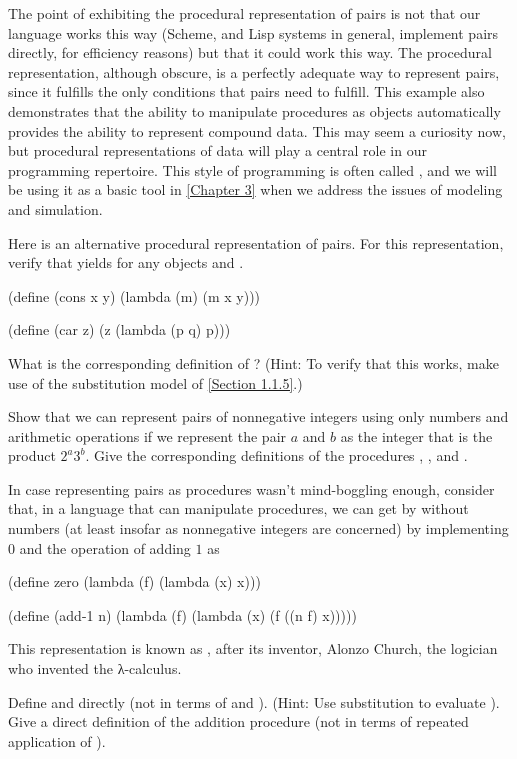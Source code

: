The point of exhibiting the procedural representation of pairs is not that our language works this way (Scheme, and Lisp systems in general, implement pairs directly, for efficiency reasons) but that it could work this way.
The procedural representation, although obscure, is a perfectly adequate way to represent pairs, since it fulfills the only conditions that pairs need to fulfill.
This example also demonstrates that the ability to manipulate procedures as objects automatically provides the ability to represent compound data.
This may seem a curiosity now, but procedural representations of data will play a central role in our programming repertoire.
This style of programming is often called , and we will be using it as a basic tool in \cref{Chapter 3} when we address the issues of modeling and simulation.



\begin{exercise}
	\label{Exercise 2.4}
	Here is an alternative procedural representation of pairs.
	For this representation, verify that  yields  for any objects  and .
	\begin{scheme}
	  (define (cons x y)
	    (lambda (m) (m x y)))

	  (define (car z)
	    (z (lambda (p q) p)))
	\end{scheme}
	What is the corresponding definition of ?
	(Hint:
	To verify that this works, make use of the substitution model of \cref{Section 1.1.5}.)
\end{exercise}



\begin{exercise}
	\label{Exercise 2.5}
	Show that we can represent pairs of nonnegative integers using only numbers and arithmetic operations if we represent the pair \( a \) and \( b \) as the integer that is the product \( 2^a 3^b \).
	Give the corresponding definitions of the procedures , , and .
\end{exercise}



\begin{exercise}
	\label{Exercise 2.6}
	In case representing pairs as procedures wasn’t mind-boggling enough, consider that, in a language that can manipulate procedures, we can get by without numbers (at least insofar as nonnegative integers are concerned) by implementing \( 0 \) and the operation of adding \( 1 \) as
	\begin{scheme}
	  (define zero (lambda (f) (lambda (x) x)))

	  (define (add-1 n)
	    (lambda (f) (lambda (x) (f ((n f) x)))))
	\end{scheme}
	This representation is known as , after its inventor, Alonzo Church, the logician who invented the λ-calculus.

	Define  and  directly (not in terms of  and ).
	(Hint:
	Use substitution to evaluate ).
	Give a direct definition of the addition procedure \code{+} (not in terms of repeated application of ).
\end{exercise}
